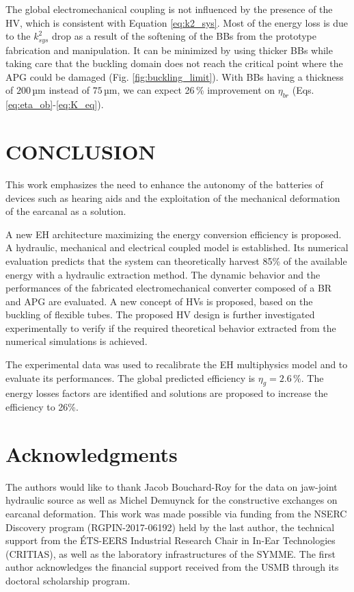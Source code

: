 \documentclass[3p,twocolumn,preprint]{elsarticle}
\begin{document}
The global electromechanical coupling is not influenced by the presence of the HV, which is consistent with Equation \ref{eq:k2_sys}. Most of the energy loss is due to the $k^2_{sys}$ drop as a result of the softening of the BBs from the prototype fabrication and manipulation. It can be minimized by using thicker BBs while taking care that the buckling domain does not reach the critical point where the APG could be damaged (Fig. \ref{fig:buckling_limit}). With BBs having a thickness of $200$\,µm instead of $75$\,µm, we can expect 26\,\% improvement on $\eta_{br}$ (Eqs. \ref{eq:eta_ob}-\ref{eq:K_eq}).
\section{CONCLUSION}
\label{sec:CONCLUSION}
This work emphasizes the need to enhance the autonomy of the batteries of devices such as hearing aids and the exploitation of the mechanical deformation of the earcanal as a solution.

A new EH architecture maximizing the energy conversion efficiency is proposed. A hydraulic, mechanical and electrical coupled model is established. Its numerical evaluation predicts that the system can theoretically harvest 85\% of the available energy with a hydraulic extraction method. The dynamic behavior and the performances of the fabricated electromechanical converter composed of a BR and APG are evaluated. A new concept of HVs is proposed, based on the buckling of flexible tubes. The proposed HV design is further investigated experimentally to verify if the required theoretical behavior extracted from the numerical simulations is achieved.

The experimental data was used to recalibrate the EH multiphysics model and to evaluate its performances. The global predicted efficiency is $\eta_g=2.6\,\%$. The energy losses factors are identified and solutions are proposed to increase the efficiency to 26\%.

\section{Acknowledgments}
The authors would like to thank Jacob Bouchard-Roy for the data on jaw-joint hydraulic source as well as Michel Demuynck for the constructive exchanges on earcanal deformation. This work was made possible via funding from the NSERC Discovery program (RGPIN-2017-06192) held by the last author, the technical support from the ÉTS-EERS Industrial Research Chair in In-Ear Technologies (CRITIAS), as well as the laboratory infrastructures of the SYMME. The first author acknowledges the financial support received from the USMB through its doctoral scholarship program. 
\end{document}
